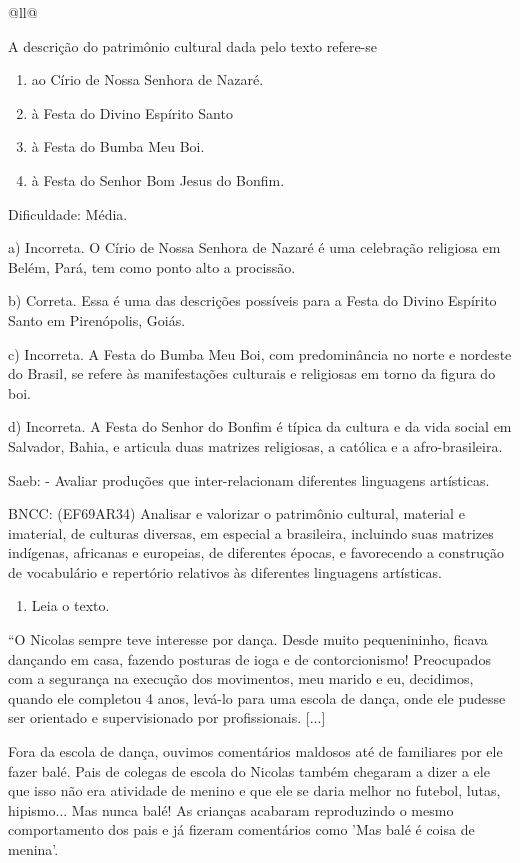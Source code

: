 \begin{itemize}
\begin{itemize}
\begin{escolha}[]{@{}ll@{}}
{{{{{{{{A descrição do patrimônio cultural dada pelo texto refere-se

\begin{enumerate}
\def\labelenumi{\alph{enumi})}
\item
  ao Círio de Nossa Senhora de Nazaré.
\item
  à Festa do Divino Espírito Santo
\item
  à Festa do Bumba Meu Boi.
\item
  à Festa do Senhor Bom Jesus do Bonfim.
\end{enumerate}

Dificuldade: Média.

a) Incorreta. O Círio de Nossa Senhora de Nazaré é uma celebração
religiosa em Belém, Pará, tem como ponto alto a procissão.

b) Correta. Essa é uma das descrições possíveis para a Festa do Divino
Espírito Santo em Pirenópolis, Goiás.

c) Incorreta. A Festa do Bumba Meu Boi, com predominância no norte e
nordeste do Brasil, se refere às manifestações culturais e religiosas em
torno da figura do boi.

d) Incorreta. A Festa do Senhor do Bonfim é típica da cultura e da vida
social em Salvador, Bahia, e articula duas matrizes religiosas, a
católica e a afro-brasileira.

Saeb: - Avaliar produções que inter-relacionam diferentes linguagens
artísticas.

BNCC: (EF69AR34) Analisar e valorizar o patrimônio cultural, material e
imaterial, de culturas diversas, em especial a brasileira, incluindo
suas matrizes indígenas, africanas e europeias, de diferentes épocas, e
favorecendo a construção de vocabulário e repertório relativos às
diferentes linguagens artísticas.

\begin{enumerate}
\def\labelenumi{\arabic{enumi}.}
\item
  Leia o texto.
\end{enumerate}

``O Nicolas sempre teve interesse por dança. Desde muito pequenininho,
ficava dançando em casa, fazendo posturas de ioga e de contorcionismo!
Preocupados com a segurança na execução dos movimentos, meu marido e eu,
decidimos, quando ele completou 4 anos, levá-lo para uma escola de
dança, onde ele pudesse ser orientado e supervisionado por
profissionais. {[}...{]}

Fora da escola de dança, ouvimos comentários maldosos até de familiares
por ele fazer balé. Pais de colegas de escola do Nicolas também chegaram
a dizer a ele que isso não era atividade de menino e que ele se daria
melhor no futebol, lutas, hipismo... Mas nunca balé! As crianças
acabaram reproduzindo o mesmo comportamento dos pais e já fizeram
comentários como 'Mas balé é coisa de menina'.

}}}}}}}}
\end{escolha}
\end{itemize}
\end{itemize}
